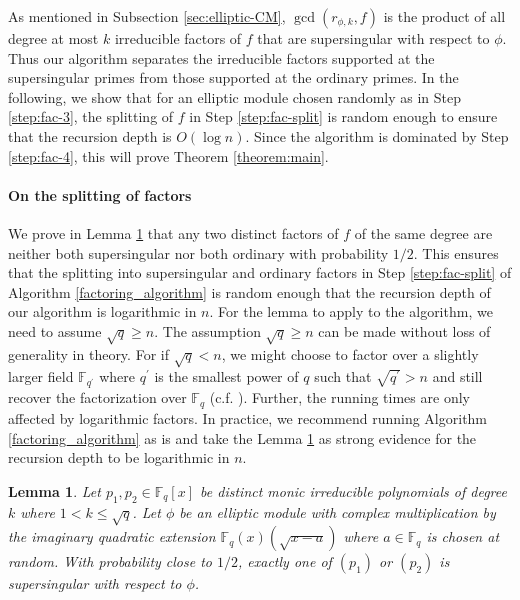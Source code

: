 \documentclass[12pt]{article}
\theoremstyle{plain}
\newtheorem{lemma}[theorem]{Lemma}
\theoremstyle{definition}
\def\F{\ensuremath{\mathbb{F}}}
\begin{document}
As mentioned in Subsection \ref{sec:elliptic-CM}, $\gcd(r_{\phi,k}, f)$ is the product of all 
degree at most $k$ irreducible factors of $f$ that are supersingular with respect to $\phi$. Thus 
our algorithm separates the irreducible factors supported at the supersingular primes from those 
supported at the ordinary primes. In the following, we show that for an elliptic module chosen  
randomly as in Step \ref{step:fac-3}, the splitting of $f$ in Step \ref{step:fac-split} is random 
enough to ensure that the recursion depth is $O(\log n)$. Since the algorithm is dominated by Step 
\ref{step:fac-4}, this will prove Theorem \ref{theorem:main}.

\paragraph{On the splitting of factors}
We prove in Lemma \ref{splitting_lemma} that any two distinct factors of $f$ of the same degree are 
neither both supersingular nor both ordinary with probability $1/2$. This ensures that the 
splitting into supersingular and ordinary factors in Step \ref{step:fac-split} of Algorithm 
\ref{factoring_algorithm} is random enough that the recursion depth of our algorithm is logarithmic 
in $n$. For the lemma to apply to the algorithm, we need to assume $\sqrt{q} \ge n$.  The 
assumption $\sqrt{q} \ge  n$ can be made without loss of generality in theory. For if $\sqrt{q} < 
n$, we might choose to factor over a slightly larger field $\F_{q^\prime}$ where $q^\prime$ is the 
smallest power of $q$ such that $\sqrt{q^\prime} > n$ and still recover the factorization over 
$\F_q$ (c.f. \cite[Remark 3.2]{nar}). Further, the running times are only affected by logarithmic 
factors. In practice, we recommend running Algorithm \ref{factoring_algorithm} as is and take the 
Lemma \ref{splitting_lemma} as strong evidence for the recursion depth to be logarithmic in $n$.
\begin{lemma}
\label{splitting_lemma}
	Let $p_1,p_2 \in \F_q[x]$ be distinct monic irreducible polynomials of degree $k$ where $1 < k 
	\le \sqrt{q}$. Let $\phi$ be an elliptic module with complex multiplication by the imaginary 
	quadratic extension $\F_q(x)(\sqrt{x-a})$ where $a \in \F_q$ is chosen at random. With 
	probability close to $1/2$, exactly one of $(p_1)$ or $(p_2)$ is supersingular with respect to 
	$\phi$.
\end{lemma}
\end{document}
